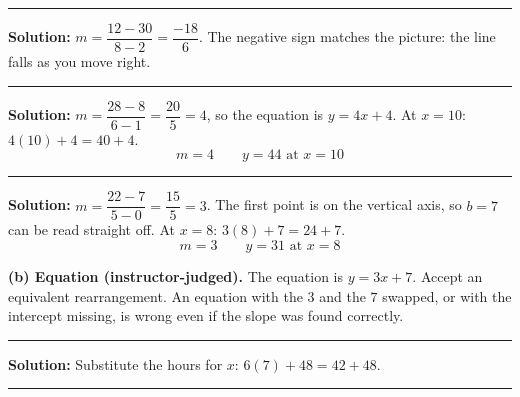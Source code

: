 \documentclass[12pt]{article}
\begin{document}
\vspace{0.2cm}

\noindent\rule{\linewidth}{0.2pt}


\textbf{Solution:} \quad $m = \dfrac{12 - 30}{8 - 2} = \dfrac{-18}{6}$. The negative sign matches
the picture: the line falls as you move right. 

\vspace{0.2cm}

\noindent\rule{\linewidth}{0.2pt}


\textbf{Solution:} \quad $m = \dfrac{28 - 8}{6 - 1} = \dfrac{20}{5} = 4$, so the equation is
$y = 4x + 4$. At $x = 10$: $4(10) + 4 = 40 + 4$.
\[ \boxed{m = 4 \qquad y = 44 \text{ at } x = 10} \]

\vspace{0.2cm}

\noindent\rule{\linewidth}{0.2pt}


\textbf{Solution:} \quad $m = \dfrac{22 - 7}{5 - 0} = \dfrac{15}{5} = 3$. The first point is on the
vertical axis, so $b = 7$ can be read straight off. At $x = 8$: $3(8) + 7 = 24 + 7$.
\[ \boxed{m = 3 \qquad y = 31 \text{ at } x = 8} \]

\textbf{(b) Equation (instructor-judged).} The equation is $y = 3x + 7$. Accept an equivalent
rearrangement. An equation with the $3$ and the $7$ swapped, or with the intercept missing, is
wrong even if the slope was found correctly.

\vspace{0.2cm}

\noindent\rule{\linewidth}{0.2pt}


\textbf{Solution:} \quad Substitute the hours for $x$: $6(7) + 48 = 42 + 48$. 

\vspace{0.2cm}

\noindent\rule{\linewidth}{0.2pt}

\end{document}
